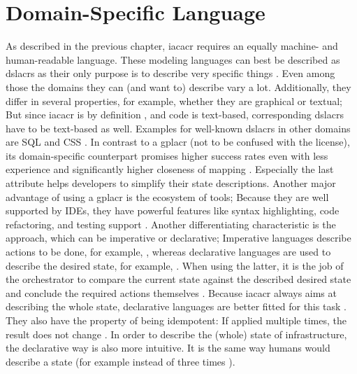 
\section{Domain-Specific Language}
As described in the previous chapter, \gls{iacacr} requires an equally machine- and human-readable language. These modeling languages can best be described as \gls{dslacr}s as their only purpose is to describe very specific things \cite{dsl_web_app}. Even among those the domains they can (and want to) describe vary a lot. Additionally, they differ in several properties, for example, whether they are graphical or textual; But since \gls{iacacr} is by definition , and code is text-based, corresponding \gls{dslacr}s have to be text-based as well. Examples for well-known \gls{dslacr}s in other domains are SQL and CSS \cite{dsl_slides}.
\newline
In contrast to a \gls{gplacr} (not to be confused with the license), its domain-specific counterpart promises higher success rates even with less experience and significantly higher closeness of mapping \cite{comparing_gpl_dsl}. Especially the last attribute helps developers to simplify their state descriptions. Another major advantage of using a \gls{gplacr} is the ecosystem of tools; Because they are well supported by IDEs, they have powerful features like syntax highlighting, code refactoring, and testing support \cite{iac_oreilly}.
\newline
Another differentiating characteristic is the approach, which can be imperative or declarative; Imperative languages describe actions to be done, for example, , whereas declarative languages are used to describe the desired state, for example, . When using the latter, it is the job of the orchestrator to compare the current state against the described desired state and conclude the required actions themselves \cite{dsl_for_iac}.
Because \gls{iacacr} always aims at describing the whole state, declarative languages are better fitted for this task \cite{iac_oreilly}. They also have the property of being idempotent: If applied multiple times, the result does not change \cite{iac_oreilly}. In order to describe the (whole) state of infrastructure, the declarative way is also more intuitive. It is the same way humans would describe a state (for example  instead of three times ).
